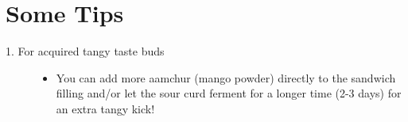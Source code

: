 \documentclass{article} %
\begin{document}
\section*{Some Tips} 
\begin{description}
    \item[1. For acquired tangy taste buds]\hfill
\begin{itemize}
\item  You can add more aamchur (mango powder) directly to the sandwich filling and/or let the sour curd ferment for a longer time (2-3 days) for an extra tangy kick!
\end{itemize}
\end{description}
\end{document}
